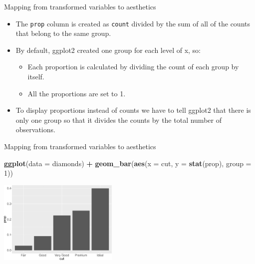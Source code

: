 \documentclass[ignorenonframetext,]{beamer}
\newenvironment{Shaded}{\begin{snugshade}}{\end{snugshade}}
\newcommand{\DataTypeTok}[1]{\textcolor[rgb]{0.13,0.29,0.53}{#1}}
\newcommand{\DecValTok}[1]{\textcolor[rgb]{0.00,0.00,0.81}{#1}}
\newcommand{\KeywordTok}[1]{\textcolor[rgb]{0.13,0.29,0.53}{\textbf{#1}}}
\newcommand{\NormalTok}[1]{#1}
\newcommand{\OperatorTok}[1]{\textcolor[rgb]{0.81,0.36,0.00}{\textbf{#1}}}
\newcommand{\StringTok}[1]{\textcolor[rgb]{0.31,0.60,0.02}{#1}}
\providecommand{\tightlist}{%
  \setlength{\itemsep}{0pt}\setlength{\parskip}{0pt}}
\begin{document}
\begin{frame}[fragile]{Mapping from transformed variables to aesthetics}
\protect\hypertarget{mapping-from-transformed-variables-to-aesthetics-3}{}

\begin{itemize}
\item
  The \texttt{prop} column is created as \texttt{count} divided by the
  sum of all of the counts that belong to the same group.
\item
  By default, ggplot2 created one group for each level of x, so:

  \begin{itemize}
  \tightlist
  \item
    Each proportion is calculated by dividing the count of each group by
    itself.
  \item
    All the proportions are set to 1.
  \end{itemize}
\item
  To display proportions instead of counts we have to tell ggplot2 that
  there is only one group so that it divides the counts by the total
  number of observations.
\end{itemize}

\end{frame}

\begin{frame}[fragile]{Mapping from transformed variables to aesthetics}
\protect\hypertarget{mapping-from-transformed-variables-to-aesthetics-4}{}

\begin{Shaded}
\begin{Highlighting}[]
\KeywordTok{ggplot}\NormalTok{(}\DataTypeTok{data =}\NormalTok{ diamonds) }\OperatorTok{+}\StringTok{ }
\StringTok{  }\KeywordTok{geom_bar}\NormalTok{(}\KeywordTok{aes}\NormalTok{(}\DataTypeTok{x =}\NormalTok{ cut, }\DataTypeTok{y =} \KeywordTok{stat}\NormalTok{(prop), }\DataTypeTok{group =} \DecValTok{1}\NormalTok{))}
\end{Highlighting}
\end{Shaded}

\begin{center}\includegraphics[height=150px]{data-visualization_files/figure-beamer/unnamed-chunk-121-1} \end{center}

\end{frame}
\end{document}
